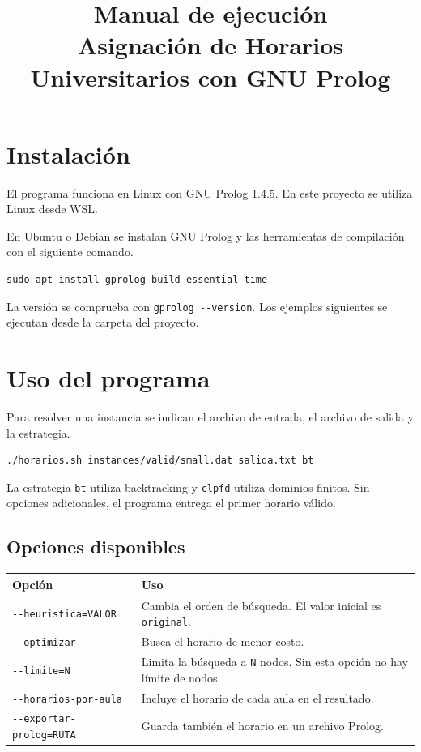 \documentclass[11pt,a4paper]{article}
\title{Manual de ejecución\\[0.4em]
    \large Asignación de Horarios Universitarios con GNU Prolog}
\author{}
\date{}
\newcommand{\clioption}[1]{\texttt{-{}-#1}}
\begin{document}
\maketitle

\section{Instalación}

El programa funciona en Linux con GNU Prolog 1.4.5. En este proyecto se utiliza Linux desde WSL.

En Ubuntu o Debian se instalan GNU Prolog y las herramientas de compilación con el siguiente comando.

\begin{lstlisting}
sudo apt install gprolog build-essential time
\end{lstlisting}

La versión se comprueba con \texttt{gprolog -{}-version}. Los ejemplos siguientes se ejecutan desde la carpeta del proyecto.

\section{Uso del programa}

Para resolver una instancia se indican el archivo de entrada, el archivo de salida y la estrategia.

\begin{lstlisting}
./horarios.sh instances/valid/small.dat salida.txt bt
\end{lstlisting}

La estrategia \texttt{bt} utiliza backtracking y \texttt{clpfd} utiliza dominios finitos. Sin opciones adicionales, el programa entrega el primer horario válido.

\subsection{Opciones disponibles}

\begin{center}
\begin{tabularx}{\linewidth}{@{}lX@{}}
\toprule
\textbf{Opción} & \textbf{Uso} \\
\midrule
\clioption{heuristica=VALOR} & Cambia el orden de búsqueda. El valor inicial es \texttt{original}. \\
\clioption{optimizar} & Busca el horario de menor costo. \\
\clioption{limite=N} & Limita la búsqueda a \texttt{N} nodos. Sin esta opción no hay límite de nodos. \\
\clioption{horarios-por-aula} & Incluye el horario de cada aula en el resultado. \\
\clioption{exportar-prolog=RUTA} & Guarda también el horario en un archivo Prolog. \\
\bottomrule
\end{tabularx}
\end{center}
\end{document}
